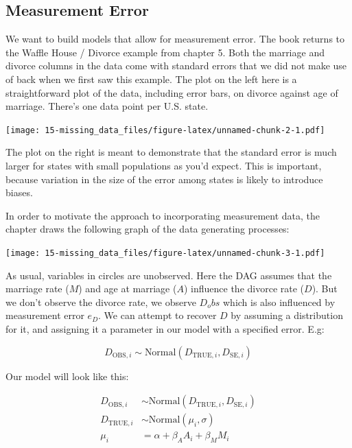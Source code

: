 \documentclass[
]{book}
\begin{document}
\hypertarget{measurement-error}{%
\subsection*{Measurement Error}\label{measurement-error}}

We want to build models that allow for measurement error. The book returns to the Waffle House / Divorce example from chapter 5. Both the marriage and divorce columns in the data come with standard errors that we did not make use of back when we first saw this example. The plot on the left here is a straightforward plot of the data, including error bars, on divorce against age of marriage. There's one data point per U.S. state.

\texttt{[image: 15-missing\_data\_files/figure-latex/unnamed-chunk-2-1.pdf]}

The plot on the right is meant to demonstrate that the standard error is much larger for states with small populations as you'd expect. This is important, because variation in the size of the error among states is likely to introduce biases.

In order to motivate the approach to incorporating measurement data, the chapter draws the following graph of the data generating processes:

\texttt{[image: 15-missing\_data\_files/figure-latex/unnamed-chunk-3-1.pdf]}

As usual, variables in circles are unobserved. Here the DAG assumes that the marriage rate (\(M\)) and age at marriage (\(A\)) influence the divorce rate (\(D\)). But we don't observe the divorce rate, we observe \(D_obs\) which is also influenced by measurement error \(e_D\). We can attempt to recover \(D\) by assuming a distribution for it, and assigning it a parameter in our model with a specified error. E.g:

\[
D_{\text{OBS},i} \sim \text{Normal}(D_{\text{TRUE},i},D_{\text{SE},i})
\]

Our model will look like this:

\[
\begin{aligned}
D_{\text{OBS},i} &\sim \text{Normal}(D_{\text{TRUE},i},D_{\text{SE},i}) \\
D_{\text{TRUE},i} &\sim \text{Normal}(\mu_i,\sigma) \\
\mu_i &= \alpha + \beta_A A_i + \beta_M M_i\\
\end{aligned}
\]
\end{document}
